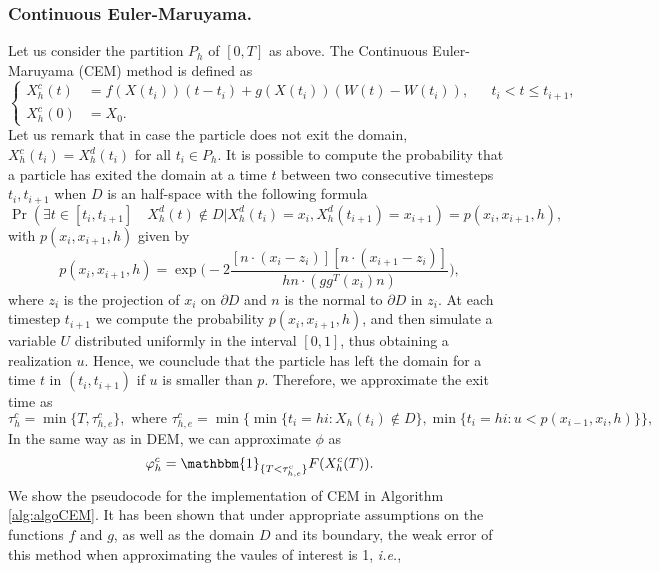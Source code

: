 \subsubsection{Continuous Euler-Maruyama. }
Let us consider the partition $P_h$ of $[0,T]$ as above. The Continuous Euler-Maruyama (CEM) method is defined as
\begin{equation}\label{eq:CEM}
	\left \{
	\begin{aligned}
		X_h^c(t) &= f(X(t_i))(t-t_i) + g(X(t_i))(W(t) - W(t_{i})),  && t_i < t \leq t_{i+1},\\
		X_h^c(0) &= X_0.
	\end{aligned} \right .
\end{equation} 
Let us remark that in case the particle does not exit the domain, $X_h^c(t_i) = X_h^d(t_i)$ for all $t_i \in P_h$. It is possible to compute the probability that a particle has exited the domain at a time $t$ between two consecutive timesteps $t_i,t_{i+1}$ when $D$ is an half-space with the following formula \cite{Gobet2001}
\begin{equation}\label{eq:CEMProb}
	\Pr (\exists t \in [ t_i,t_{i+1} ] \quad X_h^d(t) \notin D | X_h^d(t_i) = x_i, X_h^d(t_{i+1}) = x_{i+1}) = p(x_i,x_{i+1},h),
\end{equation}
with $p(x_i,x_{i+1},h)$ given by
\begin{equation}\label{eq:CEMProbHalfSpace}
	p(x_i,x_{i+1},h) = \exp\Big(-2\frac{[n\cdot(x_i - z_i)][n\cdot(x_{i+1} - z_i)]}{hn\cdot (gg^T(x_i)n)}\Big),
\end{equation}
where $z_i$ is the projection of $x_i$ on $\partial D$ and $n$ is the normal to $\partial D$ in $z_i$. At each timestep $t_{i+1}$ we compute the probability $p(x_i,x_{i+1},h)$, and then simulate a variable $U$ distributed uniformly in the interval $\left[0,1\right]$, thus obtaining a realization $u$. Hence, we counclude that the particle has left the domain for a time $t$ in $(t_i,t_{i+1})$ if $u$ is smaller than $p$. Therefore, we approximate the exit time as
\begin{equation}\label{eq:TauCEM}
	\tau_h^c = \min \{T,\tau_{h,e}^c\}, \text{ where } \tau_{h,e}^c = \min\{\min\{t_i = hi \colon X_h(t_i) \notin D\}, \min\{t_i = hi \colon u < p(x_{i-1},x_i,h) \}\},
\end{equation}
In the same way as in DEM, we can approximate $\phi$ as
\begin{equation}\label{eq:PhiCEM}
	\phi_h^c = \mathbbm{1}_{\{T < \tau_{h,e}^c\}}F(X_h^c(T)).
\end{equation}
We show the pseudocode for the implementation of CEM in Algorithm \ref{alg:algoCEM}. It has been shown \cite{Gobet2010} that under appropriate assumptions on the functions $f$ and $g$, as well as the domain $D$ and its boundary, the weak error of this method when approximating the vaules of interest is 1, \textit{i.e.},
